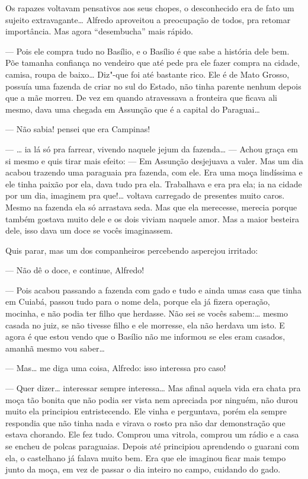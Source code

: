 Os rapazes voltavam pensativos aos seus chopes, o desconhecido era de
fato um sujeito extravagante\ldots{} Alfredo aproveitou a preocupação de
todos, pra retomar importância. Mas agora ``desembucha'' mais rápido.

--- Pois ele compra tudo no Basílio, e o Basílio é que sabe a história
dele bem. Põe tamanha confiança no vendeiro que até pede pra ele fazer
compra na cidade, camisa, roupa de baixo\ldots{} Diz"-que foi até bastante
rico. Ele é de Mato Grosso, possuía uma fazenda de criar no sul do
Estado, não tinha parente nenhum depois que a mãe morreu. De vez em
quando atravessava a fronteira que ficava ali mesmo, dava uma chegada em
Assunção que é a capital do Paraguai\ldots{}

--- Não sabia! pensei que era Campinas!

--- \ldots{} ia lá só pra farrear, vivendo naquele jejum da fazenda\ldots{} ---
Achou graça em si mesmo e quis tirar mais efeito: --- Em Assunção
desjejuava a valer. Mas um dia acabou trazendo uma paraguaia pra
fazenda, com ele. Era uma moça lindíssima e ele tinha paixão por ela,
dava tudo pra ela. Trabalhava e era pra ela; ia na cidade por um dia,
imaginem pra que!\ldots{} voltava carregado de presentes muito caros. Mesmo
na fazenda ela só arrastava seda. Mas que ela merecesse, merecia porque
também gostava muito dele e os dois viviam naquele amor. Mas a maior
besteira dele, isso dava um doce se vocês imaginassem.

Quis parar, mas um dos companheiros percebendo asperejou irritado:

--- Não dê o doce, e continue, Alfredo!

--- Pois acabou passando a fazenda com gado e tudo e ainda umas casa que
tinha em Cuiabá, passou tudo para o nome dela, porque ela já fizera
operação, mocinha, e não podia ter filho que herdasse. Não sei se vocês
sabem:\ldots{} mesmo casada no juiz, se não tivesse filho e ele morresse, ela
não herdava um isto. E agora é que estou vendo que o Basílio não me
informou se eles eram casados, amanhã mesmo vou saber\ldots{}

--- Mas\ldots{} me diga uma coisa, Alfredo: isso interessa pro caso!

--- Quer dizer\ldots{} interessar sempre interessa\ldots{} Mas afinal aquela vida
era chata pra moça tão bonita que não podia ser vista nem apreciada por
ninguém, não durou muito ela principiou entristecendo. Ele vinha e
perguntava, porém ela sempre respondia que não tinha nada e virava o
rosto pra não dar demonstração que estava chorando. Ele fez tudo.
Comprou uma vitrola, comprou um rádio e a casa se encheu de polcas
paraguaias. Depois até principiou aprendendo o guarani com ela, o
castelhano já falava muito bem. Era que ele imaginou ficar mais tempo
junto da moça, em vez de passar o dia inteiro no campo, cuidando do
gado.

